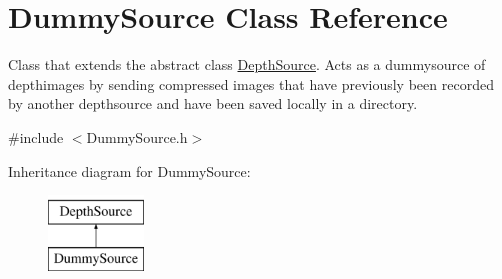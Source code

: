 \hypertarget{class_dummy_source}{\section{Dummy\+Source Class Reference}
\label{class_dummy_source}
}


Class that extends the abstract class \hyperlink{class_depth_source}{Depth\+Source}. Acts as a dummysource of depthimages by sending compressed images that have previously been recorded by another depthsource and have been saved locally in a directory.  




{\ttfamily \#include $<$Dummy\+Source.\+h$>$}

Inheritance diagram for Dummy\+Source\+:\begin{figure}[H]
\begin{center}
\leavevmode
\includegraphics[height=2.000000cm]{class_dummy_source}
\end{center}
\end{figure}
